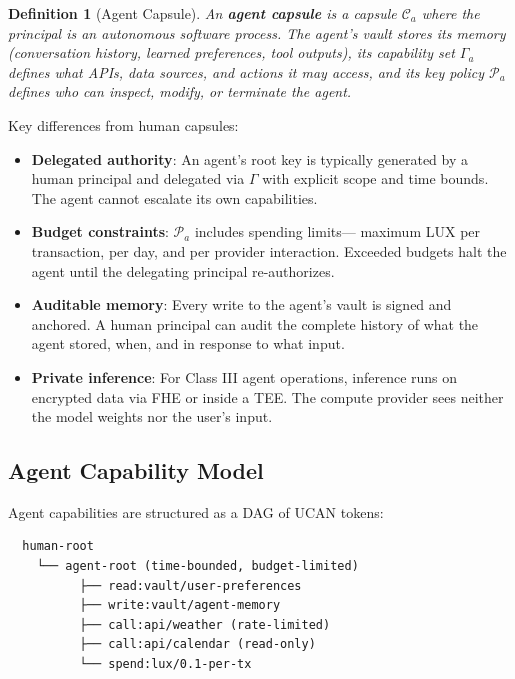 \documentclass[11pt,a4paper]{article}
\newtheorem{definition}{Definition}[section]
\begin{document}
\begin{definition}[Agent Capsule]\label{def:agent}
An \textbf{agent capsule} is a capsule $\mathcal{C}_a$ where the principal is
an autonomous software process. The agent's vault stores its memory (conversation
history, learned preferences, tool outputs), its capability set $\Gamma_a$
defines what APIs, data sources, and actions it may access, and its key policy
$\mathcal{P}_a$ defines who can inspect, modify, or terminate the agent.
\end{definition}

Key differences from human capsules:

\begin{itemize}[nosep]
  \item \textbf{Delegated authority}: An agent's root key is typically generated
        by a human principal and delegated via $\Gamma$ with explicit scope
        and time bounds. The agent cannot escalate its own capabilities.
  \item \textbf{Budget constraints}: $\mathcal{P}_a$ includes spending limits---
        maximum LUX per transaction, per day, and per provider interaction.
        Exceeded budgets halt the agent until the delegating principal
        re-authorizes.
  \item \textbf{Auditable memory}: Every write to the agent's vault is signed
        and anchored. A human principal can audit the complete history of what
        the agent stored, when, and in response to what input.
  \item \textbf{Private inference}: For Class III agent operations, inference
        runs on encrypted data via FHE or inside a TEE. The compute provider
        sees neither the model weights nor the user's input.
\end{itemize}

\subsection{Agent Capability Model}

Agent capabilities are structured as a DAG of UCAN tokens:

\begin{verbatim}
  human-root
    └── agent-root (time-bounded, budget-limited)
          ├── read:vault/user-preferences
          ├── write:vault/agent-memory
          ├── call:api/weather (rate-limited)
          ├── call:api/calendar (read-only)
          └── spend:lux/0.1-per-tx
\end{verbatim}
\end{document}
